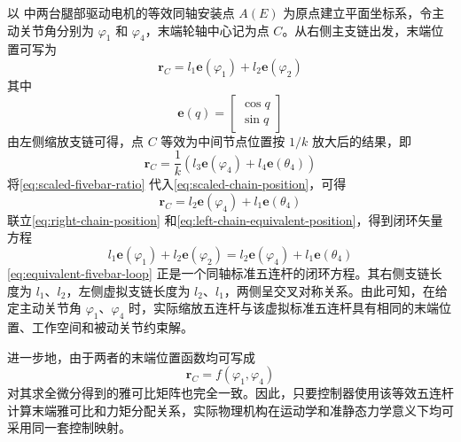 以 中两台腿部驱动电机的等效同轴安装点 $A(E)$ 为原点建立平面坐标系，令主动关节角分别为 $\varphi_1$ 和 $\varphi_4$，末端轮轴中心记为点 $C$。从右侧主支链出发，末端位置可写为
\begin{equation}
  \boldsymbol{r}_C
  =
  l_1\boldsymbol{e}(\varphi_1)
  +
  l_2\boldsymbol{e}(\varphi_2)
  \label{eq:right-chain-position}
\end{equation}
其中
\begin{equation}
  \boldsymbol{e}(q) =
  \begin{bmatrix}
    \cos q \\
    \sin q
  \end{bmatrix}
  \label{eq:unit-vector}
\end{equation}
由左侧缩放支链可得，点 $C$ 等效为中间节点位置按 $1/k$ 放大后的结果，即
\begin{equation}
  \boldsymbol{r}_C
  =
  \frac{1}{k}
  \left(
    l_3\boldsymbol{e}(\varphi_4)
    +
    l_4\boldsymbol{e}(\theta_4)
  \right)
  \label{eq:scaled-chain-position}
\end{equation}
将\eqref{eq:scaled-fivebar-ratio} 代入\eqref{eq:scaled-chain-position}，可得
\begin{equation}
  \boldsymbol{r}_C
  =
  l_2\boldsymbol{e}(\varphi_4)
  +
  l_1\boldsymbol{e}(\theta_4)
  \label{eq:left-chain-equivalent-position}
\end{equation}
联立\eqref{eq:right-chain-position} 和\eqref{eq:left-chain-equivalent-position}，得到闭环矢量方程
\begin{equation}
  l_1\boldsymbol{e}(\varphi_1)
  +
  l_2\boldsymbol{e}(\varphi_2)
  =
  l_2\boldsymbol{e}(\varphi_4)
  +
  l_1\boldsymbol{e}(\theta_4)
  \label{eq:equivalent-fivebar-loop}
\end{equation}
\eqref{eq:equivalent-fivebar-loop} 正是一个同轴标准五连杆的闭环方程。其右侧支链长度为 $l_1$、$l_2$，左侧虚拟支链长度为 $l_2$、$l_1$，两侧呈交叉对称关系。由此可知，在给定主动关节角 $\varphi_1$、$\varphi_4$ 时，实际缩放五连杆与该虚拟标准五连杆具有相同的末端位置、工作空间和被动关节约束解。

进一步地，由于两者的末端位置函数均可写成
\begin{equation}
  \boldsymbol{r}_C = f(\varphi_1,\varphi_4)
  \label{eq:endpoint-position-function}
\end{equation}
对其求全微分得到的雅可比矩阵也完全一致。因此，只要控制器使用该等效五连杆计算末端雅可比和力矩分配关系，实际物理机构在运动学和准静态力学意义下均可采用同一套控制映射。

